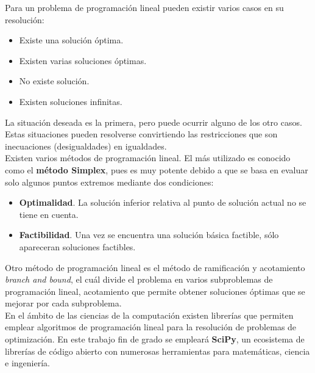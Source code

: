 Para un problema de programación lineal pueden existir varios casos en su resolución:
\begin{itemize}
\item Existe una solución óptima.
\item Existen varias soluciones óptimas.
\item No existe solución.
\item Existen soluciones infinitas.
\end{itemize}
La situación deseada es la primera, pero puede ocurrir alguno de los otro casos. Estas situaciones pueden resolverse convirtiendo las restricciones que son inecuaciones (desigualdades) en igualdades.\\

Existen varios métodos de programación lineal. El más utilizado es conocido como el \textbf{método Simplex}, pues es muy potente debido a que se basa en evaluar solo algunos puntos extremos mediante dos condiciones:
\begin{itemize}
\item \textbf{Optimalidad}. La solución inferior relativa al punto de solución actual no se tiene en cuenta.
  \item \textbf{Factibilidad}. Una vez se encuentra una solución básica factible, sólo apareceran soluciones factibles.
\end{itemize}
Otro método de programación lineal es el método de ramificación y acotamiento \textit{branch and bound}, el cuál divide el problema en varios subproblemas de programación lineal, acotamiento que permite obtener soluciones óptimas que se mejorar por cada subproblema.\\

En el ámbito de las ciencias de la computación existen librerías que permiten emplear algoritmos de programación lineal para la resolución de problemas de optimización. En este trabajo fin de grado se empleará \textbf{SciPy}, un ecosistema de librerías de código abierto con numerosas herramientas para matemáticas, ciencia e ingeniería.

